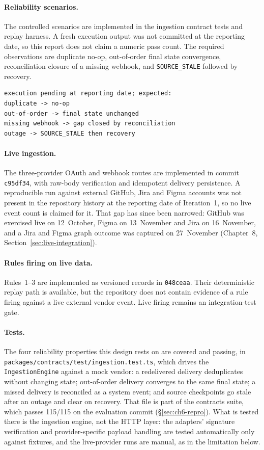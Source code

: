 \paragraph{Reliability scenarios.} The controlled scenarios are implemented in
the ingestion contract tests and replay harness. A fresh execution output was
not committed at the reporting date, so this report does not claim a numeric
pass count. The required observations are duplicate no-op, out-of-order final
state convergence, reconciliation closure of a missing webhook, and
\texttt{SOURCE\_STALE} followed by recovery.
{\small
\begin{verbatim}
execution pending at reporting date; expected:
duplicate -> no-op
out-of-order -> final state unchanged
missing webhook -> gap closed by reconciliation
outage -> SOURCE_STALE then recovery
\end{verbatim}
}

\paragraph{Live ingestion.} The three-provider OAuth and webhook routes are
implemented in commit \texttt{c95df34}, with raw-body verification and
idempotent delivery persistence. A reproducible run against external GitHub,
Jira and Figma accounts was not present in the repository history at the
reporting date of Iteration~1, so no live event count is claimed for it. That
gap has since been narrowed: GitHub was exercised live on 12~October, Figma on
13~November and Jira on 16~November, and a Jira and Figma graph outcome was
captured on 27~November (Chapter~8, Section~\ref{sec:live-integration}).

\paragraph{Rules firing on live data.} Rules~1--3 are implemented as versioned
records in \texttt{048ceaa}. Their deterministic replay path is available, but
the repository does not contain evidence of a rule firing against a live
external vendor event. Live firing remains an integration-test gate.

\paragraph{Tests.} The four reliability properties this design rests on are
covered and passing, in
\texttt{packages/contracts/test/ingestion.test.ts}, which drives the
\texttt{IngestionEngine} against a mock vendor: a redelivered delivery
deduplicates without changing state; out-of-order delivery converges to the
same final state; a missed delivery is reconciled as a system event; and source
checkpoints go stale after an outage and clear on recovery. That file is part
of the contracts suite, which passes 115/115 on the evaluation commit
(\S\ref{sec:ch6-repro}). What is tested there is the ingestion engine, not the
HTTP layer: the adapters' signature verification and provider-specific payload
handling are tested automatically only against fixtures, and the live-provider
runs are manual, as in the limitation below.

